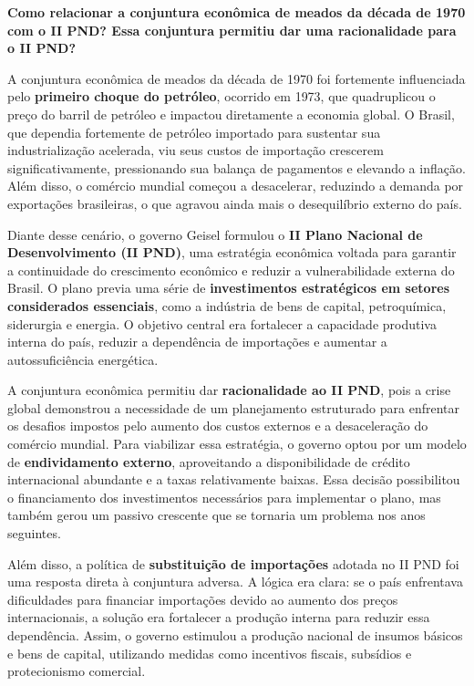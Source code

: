 \documentclass[a4paper,12pt]{article}[abntex2]
\begin{document}
\textbf{Como relacionar a conjuntura econômica de meados da década de 1970 com o II PND? Essa conjuntura permitiu dar uma racionalidade para o II PND?}

A conjuntura econômica de meados da década de 1970 foi fortemente influenciada pelo \textbf{primeiro choque do petróleo}, ocorrido em 1973, que quadruplicou o preço do barril de petróleo e impactou diretamente a economia global. O Brasil, que dependia fortemente de petróleo importado para sustentar sua industrialização acelerada, viu seus custos de importação crescerem significativamente, pressionando sua balança de pagamentos e elevando a inflação. Além disso, o comércio mundial começou a desacelerar, reduzindo a demanda por exportações brasileiras, o que agravou ainda mais o desequilíbrio externo do país.

Diante desse cenário, o governo Geisel formulou o \textbf{II Plano Nacional de Desenvolvimento (II PND)}, uma estratégia econômica voltada para garantir a continuidade do crescimento econômico e reduzir a vulnerabilidade externa do Brasil. O plano previa uma série de \textbf{investimentos estratégicos em setores considerados essenciais}, como a indústria de bens de capital, petroquímica, siderurgia e energia. O objetivo central era fortalecer a capacidade produtiva interna do país, reduzir a dependência de importações e aumentar a autossuficiência energética.

A conjuntura econômica permitiu dar \textbf{racionalidade ao II PND}, pois a crise global demonstrou a necessidade de um planejamento estruturado para enfrentar os desafios impostos pelo aumento dos custos externos e a desaceleração do comércio mundial. Para viabilizar essa estratégia, o governo optou por um modelo de \textbf{endividamento externo}, aproveitando a disponibilidade de crédito internacional abundante e a taxas relativamente baixas. Essa decisão possibilitou o financiamento dos investimentos necessários para implementar o plano, mas também gerou um passivo crescente que se tornaria um problema nos anos seguintes.

Além disso, a política de \textbf{substituição de importações} adotada no II PND foi uma resposta direta à conjuntura adversa. A lógica era clara: se o país enfrentava dificuldades para financiar importações devido ao aumento dos preços internacionais, a solução era fortalecer a produção interna para reduzir essa dependência. Assim, o governo estimulou a produção nacional de insumos básicos e bens de capital, utilizando medidas como incentivos fiscais, subsídios e protecionismo comercial.
\end{document}
